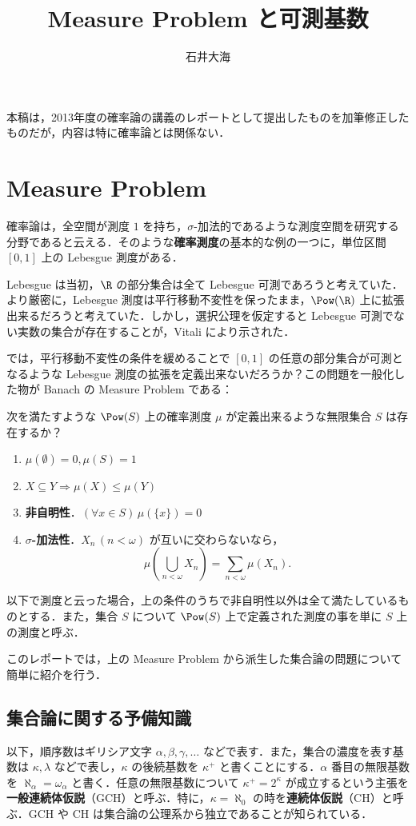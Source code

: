 \documentclass[a4j]{ltjsarticle}
\title{Measure Problem と可測基数}
\author{石井大海}
\begin{document}
\maketitle

本稿は，2013年度の確率論の講義のレポートとして提出したものを加筆修正したものだが，内容は特に確率論とは関係ない．

\section{Measure Problem}
確率論は，全空間が測度 $1$ を持ち，$\sigma$-加法的であるような測度空間を研究する分野であると云える．そのような{\bfseries 確率測度}の基本的な例の一つに，単位区間 $[0, 1]$ 上の Lebesgue 測度がある．

Lebesgue は当初，$\R$ の部分集合は全て Lebesgue 可測であろうと考えていた．より厳密に，Lebesgue 測度は平行移動不変性を保ったまま，$\Pow(\R)$ 上に拡張出来るだろうと考えていた．しかし，選択公理を仮定すると Lebesgue 可測でない実数の集合が存在することが，Vitali により示された．

では，平行移動不変性の条件を緩めることで $[0, 1]$ の任意の部分集合が可測となるような Lebesgue 測度の拡張を定義出来ないだろうか？この問題を一般化した物が Banach の Measure Problem である：

\begin{problem}
 次を満たすような $\Pow(S)$ 上の確率測度 $\mu$ が定義出来るような無限集合 $S$ は存在するか？
 \begin{enumerate}[label=(\roman*)]
  \item $\mu(\emptyset) = 0, \mu(S) = 1$
  \item $X \subseteq Y \Rightarrow \mu(X) \leq \mu(Y)$
  \item {\bfseries 非自明性}．$(\forall x \in S)\, \mu(\{x\}) = 0$
  \item {\bfseries $\sigma$-加法性}．$X_n \, (n < \omega)$ が互いに交わらないなら，
	\[
	 \mu\left(\bigcup_{n < \omega} X_n\right) = \sum_{n < \omega} \mu(X_n).
	\]
 \end{enumerate}
\end{problem}

以下で測度と云った場合，上の条件のうちで非自明性以外は全て満たしているものとする．また，集合 $S$ について $\Pow(S)$ 上で定義された測度の事を単に $S$ 上の測度と呼ぶ．

このレポートでは，上の Measure Problem から派生した集合論の問題について簡単に紹介を行う．

\subsection{集合論に関する予備知識}
以下，順序数はギリシア文字 $\alpha, \beta, \gamma, \dots$ などで表す．また，集合の濃度を表す基数は $\kappa, \lambda$ などで表し，$\kappa$ の後続基数を $\kappa^+$ と書くことにする．$\alpha$ 番目の無限基数を $\aleph_\alpha = \omega_\alpha$ と書く．任意の無限基数について $\kappa^+ = 2^\kappa$ が成立するという主張を{\bfseries 一般連続体仮説}（GCH）と呼ぶ．特に，$\kappa = \aleph_0$ の時を{\bfseries 連続体仮説}（CH）と呼ぶ．GCH や CH は集合論の公理系から独立であることが知られている．
\end{document}

